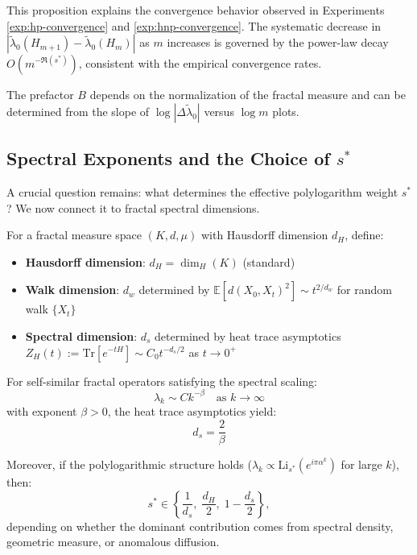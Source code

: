 \begin{remark}
This proposition explains the convergence behavior observed in Experiments \ref{exp:hp-convergence} and \ref{exp:hnp-convergence}. The systematic decrease in $|\tilde\lambda_0(H_{m+1}) - \tilde\lambda_0(H_m)|$ as $m$ increases is governed by the power-law decay $O(m^{-\Re(s^*)})$, consistent with the empirical convergence rates.

The prefactor $B$ depends on the normalization of the fractal measure and can be determined from the slope of $\log|\Delta \tilde\lambda_0|$ versus $\log m$ plots.
\end{remark}

\subsection{Spectral Exponents and the Choice of $s^*$}

A crucial question remains: what determines the effective polylogarithm weight $s^*$? We now connect it to fractal spectral dimensions.

\begin{definition}\label{def:spectral-dimensions}
For a fractal measure space $(K, d, \mu)$ with Hausdorff dimension $d_H$, define:
\begin{itemize}
\item \textbf{Hausdorff dimension}: $d_H = \dim_H(K)$ (standard)
\item \textbf{Walk dimension}: $d_w$ determined by $\mathbb{E}[d(X_0, X_t)^2] \sim t^{2/d_w}$ for random walk $\{X_t\}$
\item \textbf{Spectral dimension}: $d_s$ determined by heat trace asymptotics $Z_H(t) := \text{Tr}[e^{-tH}] \sim C_0 t^{-d_s/2}$ as $t \to 0^+$
\end{itemize}
\end{definition}

\begin{proposition}\label{prop:spectral-scaling}
For self-similar fractal operators satisfying the spectral scaling:
\[
\lambda_k \sim C k^{-\beta} \quad \text{as } k \to \infty
\]
with exponent $\beta > 0$, the heat trace asymptotics yield:
\[
d_s = \frac{2}{\beta}
\]

Moreover, if the polylogarithmic structure holds ($\lambda_k \propto \mathrm{Li}_{s^*}(e^{i\pi\alpha^k})$ for large $k$), then:
\[
s^\ast \in \left\{\frac{1}{d_s},\;\frac{d_H}{2},\;1-\frac{d_s}{2}\right\},
\]
depending on whether the dominant contribution comes from spectral density, geometric measure, or anomalous diffusion.
\end{proposition}

